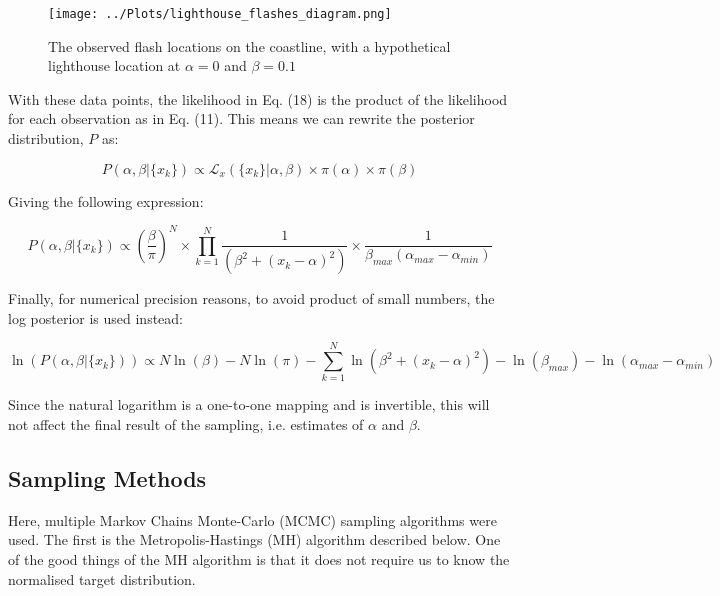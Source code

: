 \documentclass[12pt]{report} %
\begin{document}
\begin{figure}[h]
\centering
\texttt{[image: ../Plots/lighthouse\_flashes\_diagram.png]}
\caption{The observed flash locations on the coastline, with a hypothetical lighthouse location at $\alpha = 0$ and $\beta = 0.1$}
\label{fig:observations}
\end{figure}

\newpage

With these data points, the likelihood in Eq. (18) is the product of the likelihood for each observation as in Eq. (11). This means we can rewrite the posterior distribution, $P$ as:

\begin{equation}
    P(\alpha, \beta | \{x_{k}\}) \propto \mathcal{L}_{x}(\{x_{k}\} | \alpha, \beta) \times \pi(\alpha) \times \pi(\beta)
\end{equation}

Giving the following expression:

\begin{equation}
    P(\alpha, \beta | \{x_{k}\}) \propto (\frac{\beta}{\pi})^{N} \times \prod_{k=1}^{N}\frac{1}{(\beta^{2} + (x_{k} - \alpha)^{2})} \times \frac{1}{\beta_{max}(\alpha_{max} - \alpha_{min})}
\end{equation}

Finally, for numerical precision reasons, to avoid product of small numbers, the log posterior is used instead:

\begin{equation}
    \ln(P(\alpha, \beta | \{x_{k}\})) \propto N\ln(\beta) - N\ln(\pi) - \sum_{k=1}^{N}\ln(\beta^{2} + (x_{k} - \alpha)^{2}) - \ln(\beta_{max}) - \ln(\alpha_{max} - \alpha_{min})
\end{equation}

Since the natural logarithm is a one-to-one mapping and is invertible, this will not affect the final result of the sampling, i.e. estimates of $\alpha$ and $\beta$.

\subsection*{Sampling Methods}

Here, multiple Markov Chains Monte-Carlo (MCMC) sampling algorithms were used. The first is the Metropolis-Hastings (MH) algorithm described below. One of the good things of the MH algorithm is that it does not require us to know the normalised target distribution.
\end{document}
